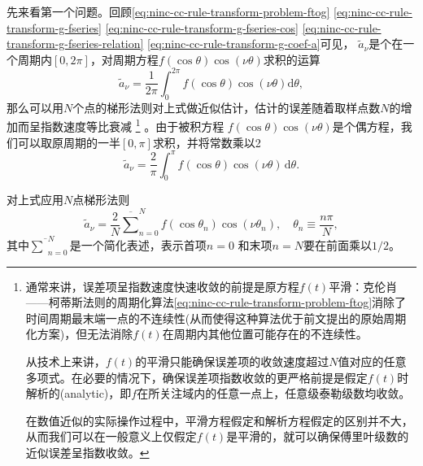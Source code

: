 先来看第一个问题。回顾\eqref{eq:ninc-cc-rule-transform-problem-ftog} \eqref{eq:ninc-cc-rule-transform-g-fseries} \eqref{eq:ninc-cc-rule-transform-g-fseries-cos} \eqref{eq:ninc-cc-rule-transform-g-fseries-relation} \eqref{eq:ninc-cc-rule-transform-g-coef-a}可见，
$\tilde{a}_{\nu}$是个在一个周期内$[0, 2\pi]$，对周期方程$f(\cos \theta) \cos \left( \nu \theta \right)$求积的运算
\begin{equation*}
  \tilde{a}_{\nu} = \frac{1}{2 \pi} \int_{0}^{2 \pi} f(\cos \theta) \cos \left( \nu \theta \right) \mathrm{d} \theta,
\end{equation*}
那么可以用$N$个点的梯形法则对上式做近似估计，估计的误差随着取样点数$N$的增加而呈指数速度等比衰减
\footnote{
通常来讲，误差项呈指数速度快速收敛的前提是原方程$f(t)$平滑：克伦肖——柯蒂斯法则的周期化算法\eqref{eq:ninc-cc-rule-transform-problem-ftog}消除了时间周期最末端一点的不连续性(从而使得这种算法优于前文提出的原始周期化方案)，但无法消除$f(t)$在周期内其他位置可能存在的不连续性。

从技术上来讲，$f(t)$的平滑只能确保误差项的收敛速度超过$N$值对应的任意多项式。在必要的情况下，确保误差项指数收敛的更严格前提是假定$f(t)$时解析的(analytic)，即$f$在所关注域内的任意一点上，任意级泰勒级数均收敛。

在数值近似的实际操作过程中，平滑方程假定和解析方程假定的区别并不大，从而我们可以在一般意义上仅假定$f(t)$是平滑的，就可以确保傅里叶级数的近似误差呈指数收敛。}
。由于被积方程 $f(\cos \theta) \cos \left( \nu \theta \right)$是个偶方程，我们可以取原周期的一半$[0, \pi]$求积，并将常数乘以2
\begin{equation*}
  \tilde{a}_{\nu} = \frac{2}{\pi} \int_{0}^{\pi} f(\cos \theta) \cos \left( \nu \theta \right) \, \mathrm{d} \theta.
\end{equation*}

对上式应用$N$点梯形法则
\begin{equation}
  \label{eq:ninc-cc-af-1}
  \tilde{a}_{\nu} = \frac{2}{N}  \overline{\sum}_{n=0}^{N} f \left( \cos \theta_{n} \right) \cos \left( \nu \theta_{n} \right), \quad \theta_{n} \equiv \frac{n \pi}{N},
\end{equation}
其中$\overline{\sum}_{n=0}^{N}$是一个简化表述，表示首项$n=0$
和末项$n=N$要在前面乘以$1/2$。

